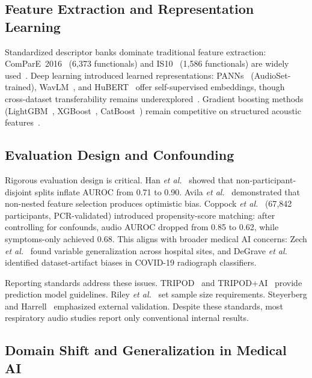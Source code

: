 \documentclass[conference]{IEEEtran}
\begin{document}
\subsection{Feature Extraction and Representation Learning}

Standardized descriptor banks dominate traditional feature extraction: ComParE~2016~\cite{schuller2016compare} (6{,}373 functionals) and IS10~\cite{schuller2010is} (1{,}586 functionals) are widely used~\cite{avila2021, muguli2021, rose2021}. Deep learning introduced learned representations: PANNs~\cite{panns2020} (AudioSet-trained), WavLM~\cite{wavlm2022}, and HuBERT~\cite{hubert2022} offer self-supervised embeddings, though cross-dataset transferability remains underexplored~\cite{aytekin2024}. Gradient boosting methods (LightGBM~\cite{ke2017lightgbm}, XGBoost~\cite{chen2016xgboost}, CatBoost~\cite{prokhorenkova2018catboost}) remain competitive on structured acoustic features~\cite{chetupalli2023, truong2024}.

\subsection{Evaluation Design and Confounding}

Rigorous evaluation design is critical. Han \emph{et al.}~\cite{han2022} showed that non-participant-disjoint splits inflate AUROC from 0.71 to 0.90. Avila \emph{et al.}~\cite{avila2021} demonstrated that non-nested feature selection produces optimistic bias. Coppock \emph{et al.}~\cite{coppock2024} (67{,}842 participants, PCR-validated) introduced propensity-score matching: after controlling for confounds, audio AUROC dropped from 0.85 to 0.62, while symptoms-only achieved 0.68. This aligns with broader medical AI concerns: Zech \emph{et al.}~\cite{zech2018} found variable generalization across hospital sites, and DeGrave \emph{et al.}~\cite{degrave2021} identified dataset-artifact biases in COVID-19 radiograph classifiers.

Reporting standards address these issues. TRIPOD~\cite{moons2015} and TRIPOD+AI~\cite{collins2024tripod} provide prediction model guidelines. Riley \emph{et al.}~\cite{riley2020} set sample size requirements. Steyerberg and Harrell~\cite{steyerberg2010} emphasized external validation. Despite these standards, most respiratory audio studies report only conventional internal results.

\subsection{Domain Shift and Generalization in Medical AI}
\end{document}
